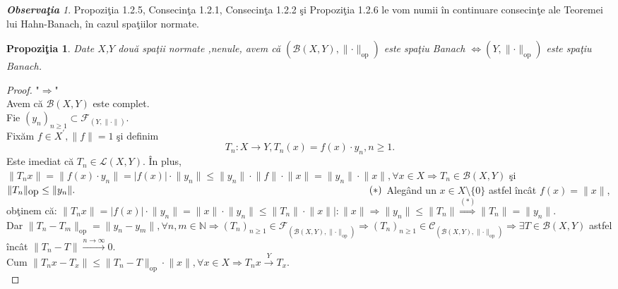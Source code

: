 \documentclass[ a4paper, 12pt]{report}
\newtheorem{prop}[theorem]{\bf Propozi\c tia }
\theoremstyle{remark}
\newtheorem{obs}{\bf Observa\c tia }[section]
\numberwithin{equation}{section}
\begin{document}
\begin{obs}
Propozi\c tia 1.2.5, Consecin\c ta 1.2.1, Consecin\c ta 1.2.2 \c si Propozi\c tia 1.2.6 le vom numii \^in continuare consecin\c te ale Teoremei lui Hahn-Banach, \^in cazul spa\c tiilor normate.
\end{obs}
\begin{prop}
Date $X$,$Y$ dou\u a spa\c tii normate ,nenule, avem c\u a $(\mathcal{B}(X,Y), \lVert \cdot \rVert_{\mbox{op}}) $ este spa\c tiu Banach $\Longleftrightarrow (Y, \lVert \cdot \rVert_{\mbox{op}})$ este spa\c tiu Banach.
\end{prop}
\begin{proof}
"$\Longrightarrow$"\\
Avem c\u a $\mathcal{B}(X,Y)$ este complet.\\
Fie $(y_n)_{n \geq 1} \subset \mathcal{F}_{(Y,\lVert \cdot \rVert)}.$\\
Fix\u am $f \in X^{'}, \lVert f \rVert = 1$ \c si definim
\[ T_n : X \rightarrow Y, T_n(x) = f(x) \cdot y_n, n \geq 1.\]
Este imediat c\u a $T_n \in \mathcal{L}(X,Y).$ \^In plus, $\lVert T_n x \rVert = \lVert f(x) \cdot y_n  \rVert = \lvert f(x) \rvert \cdot \lVert y_n \rVert \leq \lVert y_n \rVert \cdot \lVert f \rVert \cdot \lVert x \rVert = \lVert y_n  \rVert \cdot \lVert x \rVert, \forall x \in X \Rightarrow T_n \in \mathcal{B}(X,Y)$ \c si\\
 $\lVert T_n \rVert_{\mbox{op}} \leq \lVert y_n \rVert. \hspace{105mm} (\ast)$
Aleg\^and un $x \in X \setminus\{0\}$ astfel \^inc\^at $f(x) = \lVert x \rVert$, ob\c tinem c\u a: $\lVert T_n x \rVert = \lvert f(x) \rvert \cdot \lVert y_n \rVert = \lVert x \rVert \cdot \lVert y_n \rVert \leq \lVert T_n  \rVert \cdot \lVert x \rVert \Big| :\lVert x \rVert \Rightarrow \lVert y_n \rVert \leq \lVert T_n \rVert \stackrel{(\ast)}{\Rightarrow}\lVert T_n \rVert = \lVert y_n \rVert.$\\
Dar $\lVert T_n -T_m  \rVert_{\mbox{op}} = \lVert y_n - y_m \rVert, \forall n,m \in \mathbb{N} \Rightarrow (T_n)_{n \geq 1} \in \mathcal{F}_{\left(\mathcal{B}(X,Y), \lVert \cdot  \rVert_{\mbox{op}}\right)}  \Rightarrow (T_n)_{n \geq 1} \in \mathcal{C}_{\left( \mathcal{B}(X,Y), \lVert \cdot  \rVert_{\mbox{op}} \right)} \Rightarrow \exists T \in \mathcal{B}(X,Y) $ astfel \^inc\^at $\lVert T_n - T  \rVert \stackrel{n \rightarrow \infty}{\longrightarrow} 0.$\\
Cum $\lVert T_n x - T_x \rVert \leq \lVert T_n - T  \rVert_{\mbox{op}} \cdot \lVert x \rVert, \forall x \in X \Rightarrow T_n x \stackrel{Y}{\longrightarrow} T_x.$\\

\end{proof}
\end{document}
